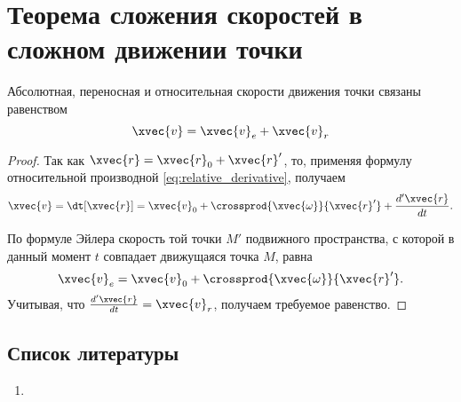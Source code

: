 \section{Теорема сложения скоростей в сложном движении точки}

\begin{theorem}
  Абсолютная, переносная и относительная скорости движения точки связаны
  равенством
  \begin{equation}
    \xvec{v} = \xvec{v}_e + \xvec{v}_r
  \end{equation}
\end{theorem}

\begin{proof}
  Так как $\xvec{r} = \xvec{r}_0 + \xvec{r}'$, то, применяя формулу
  относительной производной \ref{eq:relative_derivative}, получаем
  \begin{equation*}
    \xvec{v} = \dt[\xvec{r}] = \xvec{v}_0
      + \crossprod{\xvec{\omega}}{\xvec{r}'}
      + \frac{d' \xvec{r}}{dt}.
  \end{equation*}

  По формуле Эйлера скорость той точки $M'$ подвижного пространства, с которой в
  данный момент $t$ совпадает движущаяся точка $M$, равна
  \begin{equation*}
    \xvec{v}_e = \xvec{v}_0 + \crossprod{\xvec{\omega}}{\xvec{r}'}.
  \end{equation*}
  Учитывая, что $\frac{d' \xvec{r}}{dt} = \xvec{v}_r$, получаем требуемое
  равенство.
\end{proof}

\subsection{Список литературы}
\begin{enumerate}
  \item \cite{lectures}
\end{enumerate}

